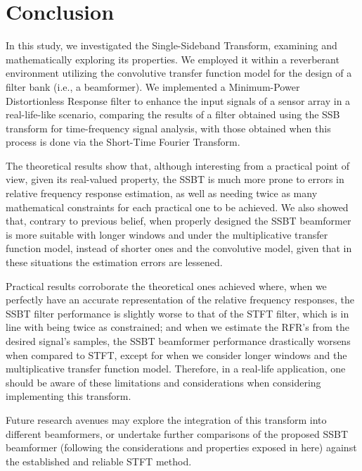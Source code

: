 \section{Conclusion}
\label{sec:conclusion}

In this study, we investigated the Single-Sideband Transform, examining and mathematically exploring its properties. We employed it within a reverberant environment utilizing the convolutive transfer function model for the design of a filter bank (i.e., a beamformer). We implemented a Minimum-Power Distortionless Response filter to enhance the input signals of a sensor array in a real-life-like scenario, comparing the results of a filter obtained using the SSB transform for time-frequency signal analysis, with those obtained when this process is done via the Short-Time Fourier Transform.

The theoretical results show that, although interesting from a practical point of view, given its real-valued property, the SSBT is much more prone to errors in relative frequency response estimation, as well as needing twice as many mathematical constraints for each practical one to be achieved. We also showed that, contrary to previous belief, when properly designed the SSBT beamformer is more suitable with longer windows and under the multiplicative transfer function model, instead of shorter ones and the convolutive model, given that in these situations the estimation errors are lessened.

Practical results corroborate the theoretical ones achieved where, when we perfectly have an accurate representation of the relative frequency responses, the SSBT filter performance is slightly worse to that of the STFT filter, which is in line with being twice as constrained; and when we estimate the RFR's from the desired signal's samples, the SSBT beamformer performance drastically worsens when compared to STFT, except for when we consider longer windows and the multiplicative transfer function model. Therefore, in a real-life application, one should be aware of these limitations and considerations when considering implementing this transform.

Future research avenues may explore the integration of this transform into different beamformers, or undertake further comparisons of the proposed SSBT beamformer (following the considerations and properties exposed in here) against the established and reliable STFT method.